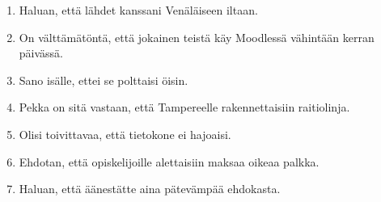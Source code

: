 \documentclass[paper=a4, fontsize=11pt]{scrartcl}
\begin{document}
\begin{enumerate}
    \item Haluan, että lähdet kanssani Venäläiseen iltaan.\\
    \underline{\hspace{12cm}}
    \item On välttämätöntä, että jokainen teistä käy Moodlessä vähintään kerran päivässä.\\
    \underline{\hspace{12cm}}
    \item Sano isälle, ettei se polttaisi öisin. \\
    \underline{\hspace{12cm}}
    \item Pekka on sitä vastaan, että Tampereelle rakennettaisiin raitiolinja. \\
    \underline{\hspace{12cm}}
    \item Olisi toivittavaa, että tietokone ei hajoaisi. \\
    \underline{\hspace{12cm}}
    \item Ehdotan, että opiskelijoille alettaisiin maksaa oikeaa palkka. \\
    \underline{\hspace{12cm}}
    \item Haluan, että äänestätte aina pätevämpää ehdokasta. \\
    \underline{\hspace{12cm}}
\end{enumerate}
\end{document}
